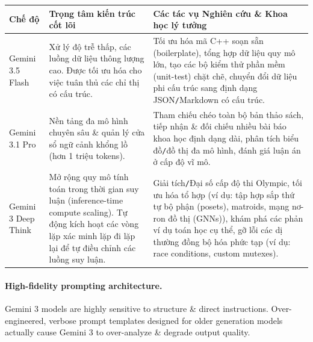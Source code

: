 \documentclass{article}
\begin{document}
\begin{table}[H]
	\centering
	\begin{tabular}{|p{2cm}|p{5.5cm}|p{10cm}|}
		\hline
		\textbf{Chế độ} & \textbf{Trọng tâm kiến trúc cốt lõi} & \textbf{Các tác vụ Nghiên cứu \& Khoa học lý tưởng} \\
		\hline
		Gemini 3.5 Flash & Xử lý độ trễ thấp, các luồng dữ liệu thông lượng cao. Được tối ưu hóa cho việc tuân thủ các chỉ thị có cấu trúc. & Tối ưu hóa mã C++ soạn sẵn (boilerplate), tổng hợp dữ liệu quy mô lớn, tạo các bộ kiểm thử phần mềm (unit-test) chặt chẽ, chuyển đổi dữ liệu phi cấu trúc sang định dạng JSON{\tt/}Markdown có cấu trúc. \\
		\hline
		Gemini 3.1 Pro & Nền tảng đa mô hình chuyên sâu \& quản lý cửa sổ ngữ cảnh khổng lồ (hơn 1 triệu tokens). & Tham chiếu chéo toàn bộ bản thảo sách, tiếp nhận \& đối chiếu nhiều bài báo khoa học định dạng dài, phân tích biểu đồ{\tt/}đồ thị đa mô hình, đánh giá luận án ở cấp độ vĩ mô. \\
		\hline
		Gemini 3 Deep Think & Mở rộng quy mô tính toán trong thời gian suy luận (inference-time compute scaling). Tự động kích hoạt các vòng lặp xác minh lặp đi lặp lại để tự điều chỉnh các luồng suy luận. & Giải tích{\tt/}Đại số cấp độ thi Olympic, tối ưu hóa tổ hợp (ví dụ: tập hợp sắp thứ tự bộ phận (posets), matroids, mạng nơ-ron đồ thị (GNNs)), khám phá các phản ví dụ toán học cụ thể, gỡ lỗi các dị thường đồng bộ hóa phức tạp (ví dụ: race conditions, custom mutexes). \\
		\hline
	\end{tabular}
\end{table}

\paragraph{High-fidelity prompting architecture.} Gemini 3 models are highly sensitive to structure \& direct instructions. Over-engineered, verbose prompt templates designed for older generation models actually cause Gemini 3 to over-analyze \& degrade output quality.
\end{document}

